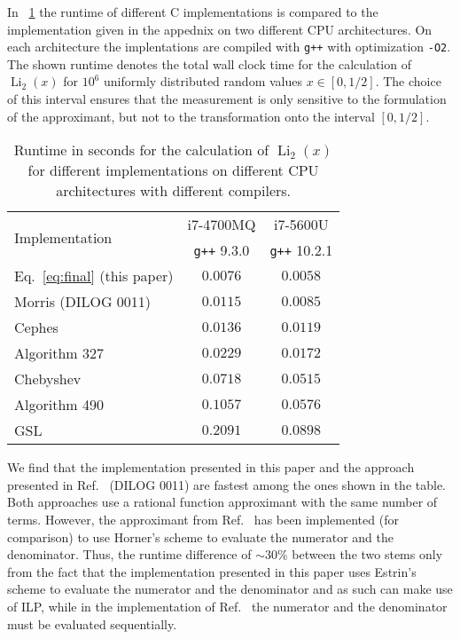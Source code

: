 \documentclass[10pt,DIV16,twocolumn,numbers=noenddot]{scrartcl}
\newcommand{\Li}{\operatorname{Li}_2}
\newcommand{\tabref}[1]{\tablename~\ref{#1}}
\begin{document}
In \tabref{tab:runtime} the runtime of different C implementations is
compared to the implementation given in the appednix on two different
CPU architectures.  On each architecture the implentations are
compiled with \texttt{g++} with optimization \texttt{-O2}.  The shown
runtime denotes the total wall clock time for the calculation of
$\Li(x)$ for $10^6$ uniformly distributed random values $x\in[0,1/2]$.
The choice of this interval ensures that the measurement is only
sensitive to the formulation of the approximant, but not to the
transformation onto the interval $[0,1/2]$.%
%
\begin{table}[tb]
  \centering
  \caption{Runtime in seconds for the calculation of $\Li(x)$ for
    different implementations on different CPU architectures with
    different compilers.}
  \begin{tabular}{lcc}
    \toprule
    \multirow{2}{*}{Implementation} & i7-4700MQ & i7-5600U \\
    & \texttt{g++} 9.3.0 & \texttt{g++} 10.2.1 \\
    \midrule
    Eq.~\eqref{eq:final} (this paper) & $0.0076$ & $0.0058$ \\
    Morris (DILOG 0011) \cite{morris} & $0.0115$ & $0.0085$ \\
    Cephes \cite{cephes}              & $0.0136$ & $0.0119$ \\
    Algorithm 327 \cite{koelbigDilog} & $0.0229$ & $0.0172$ \\
    Chebyshev \cite{luke,root}        & $0.0718$ & $0.0515$ \\
    Algorithm 490 \cite{ginsberg}     & $0.1057$ & $0.0576$ \\
    GSL \cite{gsl}                    & $0.2091$ & $0.0898$ \\
    \bottomrule
  \end{tabular}
  \label{tab:runtime}
\end{table}%

We find that the implementation presented in this paper and the
approach presented in Ref.~\cite{morris} (DILOG 0011) are fastest
among the ones shown in the table.  Both approaches use a rational
function approximant with the same number of terms.  However, the
approximant from Ref.~\cite{morris} has been implemented (for
comparison) to use Horner's scheme to evaluate the numerator and the
denominator.  Thus, the runtime difference of $\sim 30\%$ between
the two stems only from the fact that the implementation presented
in this paper uses Estrin's scheme to evaluate the numerator and the
denominator and as such can make use of ILP, while in the
implementation of Ref.~\cite{morris} the numerator and the denominator
must be evaluated sequentially.
\end{document}
